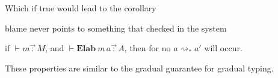Which if true would lead to the corollary
\begin{conjecture}
blame never points to something that checked in the \bidir{} system
 
if $\vdash m\overrightarrow{\,:\,}M$, and $\vdash\textbf{Elab}\ m\,a\overrightarrow{\,:\,}A$, then for no $a\rightsquigarrow_{*}a'$ will  occur.
 
\end{conjecture}
 
These properties are similar to the gradual guarantee\cite{siek_et_al:LIPIcs:2015:5031} for gradual typing.